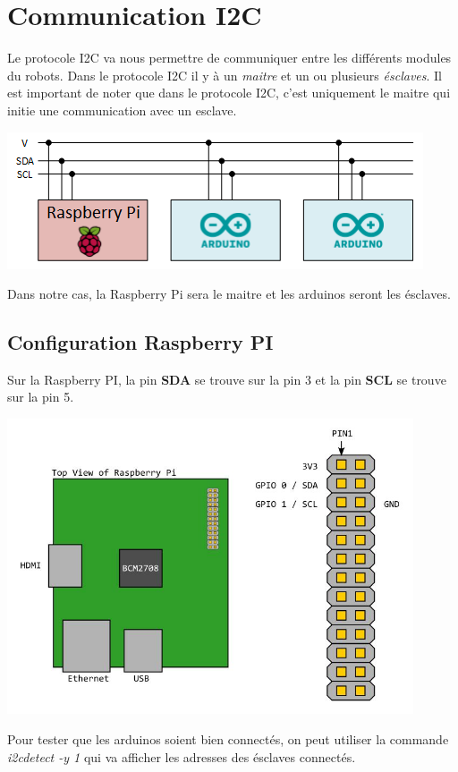 \documentclass{eurobot_report}
\begin{document}
\chapter{Communication I2C}

Le protocole I2C va nous permettre de communiquer entre les différents modules du robots. Dans le protocole I2C il y à un \textit{maitre} et un ou plusieurs \textit{ésclaves}. Il est important de noter que dans le protocole I2C, c'est uniquement le maitre qui initie une communication avec un esclave. 

\includegraphics{assets/i2c.png}

Dans notre cas, la Raspberry Pi sera le maitre et les arduinos seront les ésclaves.

\section{Configuration Raspberry PI}
Sur la Raspberry PI, la pin \textbf{SDA} se trouve sur la pin 3 et la pin \textbf{SCL} se trouve sur la pin 5.

\begin{center}
\includegraphics[width=12cm]{assets/rbp-i2c-pins}
\end{center}

Pour tester que les arduinos soient bien connectés, on peut utiliser la commande \textit{i2cdetect -y 1} qui va afficher les adresses des ésclaves connectés.
\end{document}
